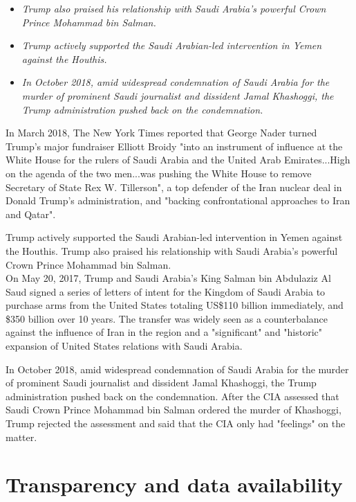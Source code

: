 \begin{itemize}
\item
  \emph{Trump also praised his relationship with Saudi Arabia's powerful
  Crown Prince Mohammad bin Salman.}
\item
  \emph{Trump actively supported the Saudi Arabian-led intervention in
  Yemen against the Houthis.}
\item
  \emph{In October 2018, amid widespread condemnation of Saudi Arabia
  for the murder of prominent Saudi journalist and dissident Jamal
  Khashoggi, the Trump administration pushed back on the condemnation.}
\end{itemize}

In March 2018, The New York Times reported that George Nader turned
Trump's major fundraiser Elliott Broidy "into an instrument of influence
at the White House for the rulers of Saudi Arabia and the United Arab
Emirates...High on the agenda of the two men...was pushing the White
House to remove Secretary of State Rex W. Tillerson", a top defender of
the Iran nuclear deal in Donald Trump's administration, and "backing
confrontational approaches to Iran and Qatar".

Trump actively supported the Saudi Arabian-led intervention in Yemen
against the Houthis. Trump also praised his relationship with Saudi
Arabia's powerful Crown Prince Mohammad bin Salman.\\
On May 20, 2017, Trump and Saudi Arabia's King Salman bin Abdulaziz Al
Saud signed a series of letters of intent for the Kingdom of Saudi
Arabia to purchase arms from the United States totaling US\$110 billion
immediately, and \$350 billion over 10 years. The transfer was widely
seen as a counterbalance against the influence of Iran in the region and
a "significant" and "historic" expansion of United States relations with
Saudi Arabia.

In October 2018, amid widespread condemnation of Saudi Arabia for the
murder of prominent Saudi journalist and dissident Jamal Khashoggi, the
Trump administration pushed back on the condemnation. After the CIA
assessed that Saudi Crown Prince Mohammad bin Salman ordered the murder
of Khashoggi, Trump rejected the assessment and said that the CIA only
had "feelings" on the matter.

\section{Transparency and data
availability}\label{transparency-and-data-availability}

